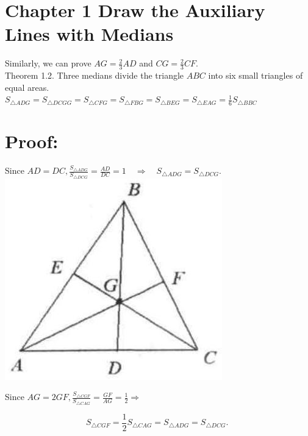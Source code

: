 \documentclass[10pt]{article}
\begin{document}
\section*{Chapter 1 Draw the Auxiliary Lines with Medians}
Similarly, we can prove \(A G=\frac{2}{3} A D\) and \(C G=\frac{2}{3} C F\).\\
Theorem 1.2. Three medians divide the triangle \(A B C\) into six small triangles of equal areas.\\
\(S_{\triangle A D G}=S_{\triangle D C G G}=S_{\triangle C F G}=S_{\triangle F B G}=S_{\triangle B E G}=S_{\triangle E A G}=\frac{1}{6} S_{\triangle B B C}\)

\section*{Proof:}
Since \(A D=D C, \frac{S_{\triangle A D G}}{S_{\triangle D C G}}=\frac{A D}{D C}=1 \quad \Rightarrow \quad S_{\triangle A D G}=S_{\triangle D C G}\).\\
\includegraphics[max width=\textwidth, center]{2025_04_17_97bc1f7e44d93c271a88g-008(1)}

Since \(A G=2 G F, \frac{S_{\triangle C G F}}{S_{\triangle C A G}}=\frac{G F}{A G}=\frac{1}{2} \Rightarrow\)

\[
S_{\triangle C G F}=\frac{1}{2} S_{\triangle C A G}=S_{\triangle A D G}=S_{\triangle D C G} \text {. }
\]
\end{document}
